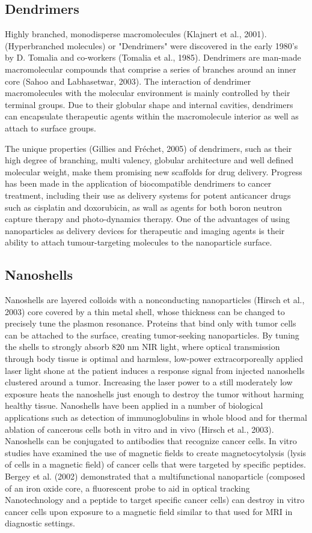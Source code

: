 \documentclass{article}
\begin{document}
\begin{multicols}
\subsection{Dendrimers}
Highly branched, monodisperse macromolecules (Klajnert et al., 2001). (Hyperbranched molecules) or "Dendrimers" were discovered in the early 1980's by D. Tomalia and co-workers (Tomalia et al., 1985). Dendrimers are man-made macromolecular compounds that comprise a series of branches around an inner core (Sahoo and Labhasetwar, 2003). The interaction of dendrimer macromolecules with the molecular environment is mainly controlled by their terminal groups. Due to their globular shape and internal cavities, dendrimers can encapsulate therapeutic agents within the macromolecule interior as well as attach to surface groups.

The unique properties (Gillies and Fréchet, 2005) of dendrimers, such as their high degree of branching, multi valency, globular architecture and well defined molecular weight, make them promising new scaffolds for drug delivery.  Progress has been made in the application of biocompatible dendrimers to cancer treatment, including their use as delivery systems for potent anticancer drugs such as
cisplatin and doxorubicin, as wall as agents
for both boron neutron capture therapy and
photo-dynamics therapy. One of the advantages of using nanoparticles as delivery devices for therapeutic and imaging agents is their ability to attach tumour-targeting molecules to the nanoparticle surface. 

\subsection{Nanoshells}
Nanoshells are layered colloids with a nonconducting nanoparticles (Hirsch et al., 2003) core covered by a thin metal shell, whose thickness can be changed to precisely tune the plasmon resonance. Proteins that bind only with tumor cells can be attached to the surface, creating tumor-seeking nanoparticles. By tuning the shells to strongly absorb 820 nm NIR light, where optical transmission through body tissue is optimal and harmless, low-power extracorporeally applied laser light shone at the patient induces a response signal from injected nanoshells clustered around a tumor. Increasing the laser power to a still moderately low exposure heats the nanoshells just enough to destroy the tumor without harming healthy tissue. Nanoshells have been applied in a number of biological applications such as detection of immunoglobulins in whole blood and for thermal ablation of cancerous cells both in
vitro and in vivo (Hirsch et al., 2003). Nanoshells can be conjugated to antibodies
that recognize cancer cells. In vitro studies
have examined the use of magnetic fields to
create magnetocytolysis (lysis of cells in a
magnetic field) of cancer cells that were targeted by specific peptides. Bergey et al.
(2002) demonstrated that a multifunctional
nanoparticle (composed of an iron oxide
core, a fluorescent probe to aid in optical
tracking Nanotechnology and a peptide to
target specific cancer cells) can destroy in
vitro cancer cells upon exposure to a magnetic field similar to that used for MRI in diagnostic settings.


\end{multicols}
\end{document}
